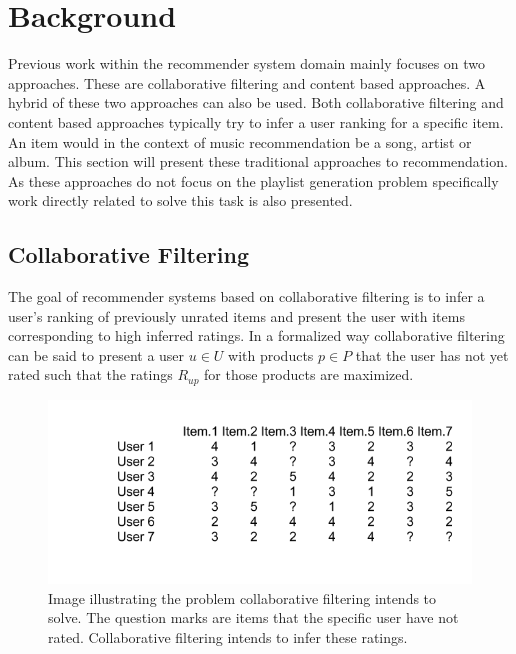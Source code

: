 \documentclass[a4paper,11pt]{kth-mag}
\begin{document}
\chapter{Background}

Previous work within the recommender system domain mainly focuses on two approaches. These are collaborative filtering and content based approaches. A hybrid of these two approaches can also be used. Both collaborative filtering and content based approaches typically try to infer a user ranking for a specific item\cite{melville2002content}. An item would in the context of music recommendation be a song, artist or album. This section will present these traditional approaches to recommendation. As these approaches do not focus on the playlist generation problem specifically work directly related to solve this task is also presented.

\section{Collaborative Filtering}
The goal of recommender systems based on collaborative filtering is to infer a user's ranking of previously unrated items and present the user with items corresponding to high inferred ratings. In a formalized way collaborative filtering can be said to present a user $u \in U$ with products $p \in P$ that the user has not yet rated such that the ratings $R_{up}$ for those products are maximized\cite{breese1998empirical}.

\begin{figure}
\includegraphics[scale=0.6]{images/colFiltMat.png}
\caption{Image illustrating the problem collaborative filtering intends to solve. The question marks are items that the specific user have not rated. Collaborative filtering intends to infer these ratings.}
\end{figure}
\end{document}
